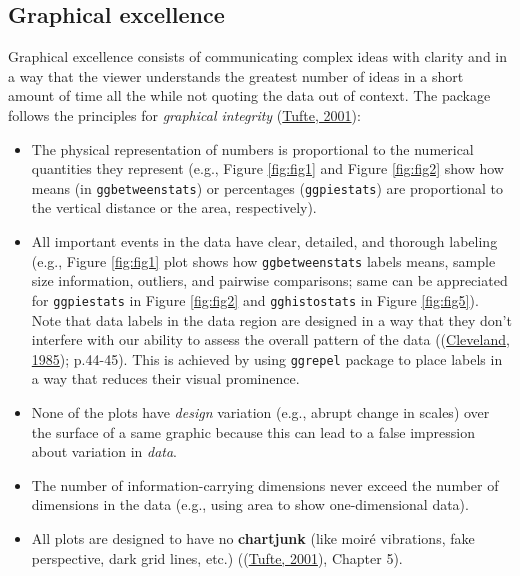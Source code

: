 \documentclass[
]{article}
\begin{document}
\hypertarget{graphical-excellence}{%
\subsection{Graphical excellence}\label{graphical-excellence}}

Graphical excellence consists of communicating complex ideas with clarity and in
a way that the viewer understands the greatest number of ideas in a short amount
of time all the while not quoting the data out of context. The package follows
the principles for \emph{graphical integrity} (\protect\hyperlink{ref-tufteVisualDisplayQuantitative2001}{Tufte, 2001}):

\begin{itemize}
\item
  The physical representation of numbers is proportional to the numerical
  quantities they represent (e.g., Figure \ref{fig:fig1} and Figure
  \ref{fig:fig2} show how means (in \texttt{ggbetweenstats}) or percentages
  (\texttt{ggpiestats}) are proportional to the vertical distance or the area,
  respectively).
\item
  All important events in the data have clear, detailed, and thorough labeling
  (e.g., Figure \ref{fig:fig1} plot shows how \texttt{ggbetweenstats} labels means,
  sample size information, outliers, and pairwise comparisons; same can be
  appreciated for \texttt{ggpiestats} in Figure \ref{fig:fig2} and \texttt{gghistostats} in
  Figure \ref{fig:fig5}). Note that data labels in the data region are
  designed in a way that they don't interfere with our ability to assess the
  overall pattern of the data ((\protect\hyperlink{ref-clevelandElementsGraphingData1985}{Cleveland, 1985});
  p.44-45). This is achieved by using \texttt{ggrepel} package to place labels in a
  way that reduces their visual prominence.
\item
  None of the plots have \emph{design} variation (e.g., abrupt change in scales)
  over the surface of a same graphic because this can lead to a false
  impression about variation in \emph{data}.
\item
  The number of information-carrying dimensions never exceed the number of
  dimensions in the data (e.g., using area to show one-dimensional data).
\item
  All plots are designed to have no \textbf{chartjunk} (like moiré vibrations, fake
  perspective, dark grid lines, etc.)
  ((\protect\hyperlink{ref-tufteVisualDisplayQuantitative2001}{Tufte, 2001}), Chapter 5).
\end{itemize}
\end{document}
